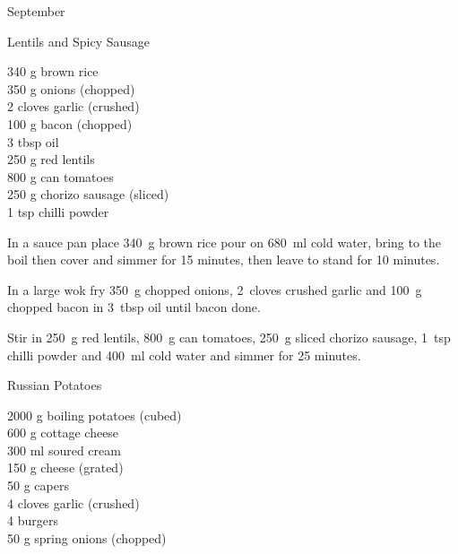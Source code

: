 \begin{menu}{September}
    \begin{recipe}{2}{Lentils and Spicy Sausage}%
		\begin{ingredients}
		340 g brown rice  \\
	350 g onions (chopped) \\
	2 cloves garlic (crushed) \\
	100 g bacon (chopped) \\
	3 tbsp oil  \\
	250 g red lentils  \\
	800 g can tomatoes  \\
	250 g chorizo sausage (sliced) \\
	1 tsp chilli powder  \\
	
		\end{ingredients}
	
	
    \begin{instructions}
    \item 
    In a
    sauce pan
    place
    340~g  brown rice
    pour on
    680~ml  cold water,
    bring to the boil then cover and simmer for 15 minutes,
    then leave to stand for 10 minutes.
  \item 
        In a large wok fry
        350~g chopped onions,
        2~cloves crushed garlic
        and
        100~g chopped bacon
        in
        3~tbsp  oil
        until bacon done.
      \item 
        Stir in
        250~g  red lentils,
        800~g  can tomatoes,
        250~g sliced chorizo sausage,
        1~tsp  chilli powder
        and
        400~ml  cold water
        and simmer for 25 minutes.
      
    \end{instructions}
    \end{recipe}%
  
    \begin{recipe}{2}{Russian Potatoes}%
		\begin{ingredients}
		2000 g boiling potatoes (cubed) \\
	600 g cottage cheese  \\
	300 ml soured cream  \\
	150 g cheese (grated) \\
	50 g capers  \\
	4 cloves garlic (crushed) \\
	4  burgers  \\
	50 g spring onions (chopped) \\
	

\end{ingredients}
\end{recipe}
\end{menu}
